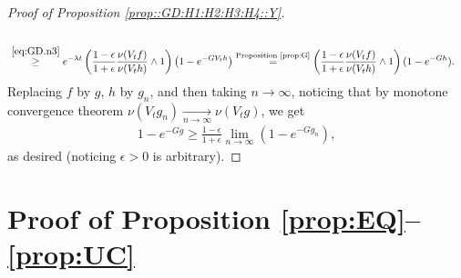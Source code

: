 \documentclass[12pt,a4paper]{amsart}
\numberwithin{equation}{section}
\theoremstyle{plain}
\theoremstyle{definition}
\theoremstyle{remark}
\begin{document}
\begin{proof}[Proof of Proposition \ref{prop::GD:H1:H2:H3:H4::Y}]
\begin{align}
	\\ &\overset{\eqref{eq:GD.n3}}\geq e^{-\lambda t} \left(\frac{1-\epsilon}{1+\epsilon} \frac{\nu(V_tf)}{\nu(V_th)} \wedge 1 \right) \left(1- e^{- GV_th }\right)
	\overset{\text{Proposition \ref{prop:G}}}= \left(\frac{1-\epsilon}{1+\epsilon} \frac{\nu(V_tf)}{\nu(V_th)} \wedge 1\right) (1 - e^{- Gh}).
\end{align}
	Replacing $f$ by $g$, $h$ by $g_n$, and then taking $n\to \infty$, noticing that by monotone convergence theorem $\nu(V_tg_n) \xrightarrow[n\to \infty]{} \nu(V_tg)$, we get
\begin{align}
	1 - e^{- Gg} \geq \frac{1 - \epsilon}{1+\epsilon}\lim_{n\to \infty}(1 - e^{- Gg_n}),
\end{align}
	as desired (noticing $\epsilon > 0$ is arbitrary).
\end{proof}

\section{Proof of Proposition \ref{prop:EQ}--\ref{prop:UC}}
\end{document}
